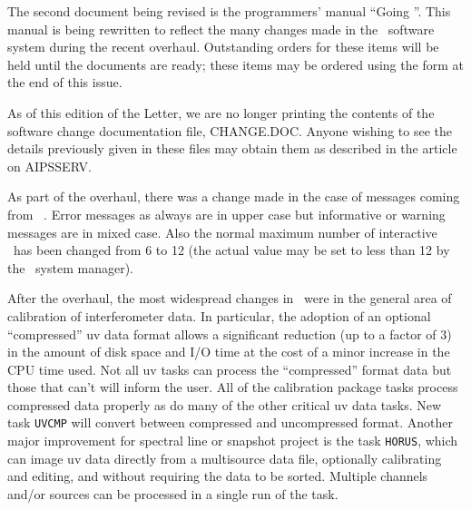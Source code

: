    The second document being revised is the programmers' manual
``Going \AIPS''.  This manual is being rewritten to reflect the many
changes made in the \AIPS\ software system during the recent overhaul.
Outstanding orders for these items will be held until the documents
are ready; these items may be ordered using the form at the end of
this issue.



   As of this edition of the \AIPS Letter, we are no longer
printing the contents of the software change documentation file,
CHANGE.DOC.  Anyone wishing to see the details previously given in
these files may obtain them as described in the article on AIPSSERV.



   As part of the overhaul, there was a change made in the case of
messages coming from \AIPS\ .  Error messages as always are in upper case
but informative or warning messages are in mixed case.  Also the
normal maximum number of interactive \AIPS\  has been changed from 6 to 12 (the
actual value may be set to less than 12 by the \AIPS\  system manager).

   After the overhaul, the most widespread changes in \AIPS\  were in the
general area of calibration of interferometer data.  In particular,
the adoption of an optional ``compressed'' uv data format allows a
significant reduction (up to a factor of 3) in the amount of disk
space and I/O time at the cost of a minor increase in the CPU time
used.  Not all uv tasks can process the ``compressed'' format data but
those that can't will inform the user.  All of the calibration
package tasks process compressed data properly as do many of the other
critical uv data tasks.  New task {\tt UVCMP} will convert between
compressed and uncompressed format.
Another major improvement for spectral line or snapshot project is
the task {\tt HORUS}, which can image uv data directly from a multisource
data file, optionally calibrating and editing, and without
requiring the data to be sorted.  Multiple channels and/or sources can be
processed in a single run of the task.

